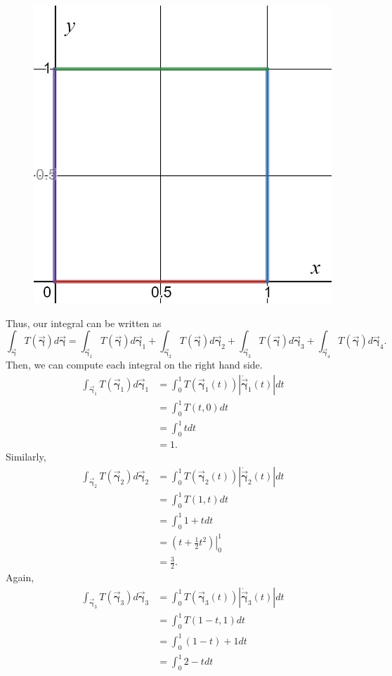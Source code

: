 \documentclass[12pt]{article} %
\newcommand{\curvegamma}{\boldsymbol{\vec{\gamma}}}
\newcommand{\tangentgamma}{\boldsymbol{\dot{\vec{\gamma}}}}
\begin{document}
\begin{solution}
\begin{enumerate}[(a)]
\begin{figure}[H]
			\includegraphics[width=.6\textwidth]{figures/plate_boundary.png}
		\end{figure}
		Thus, our integral can be written as
		\[
		\int_{\curvegamma} T(\curvegamma) d\curvegamma = \int_{\curvegamma_1} T(\curvegamma) d\curvegamma_1 + \int_{\curvegamma_2} T(\curvegamma) d\curvegamma_2 + \int_{\curvegamma_3} T(\curvegamma) d\curvegamma_3 + \int_{\curvegamma_4} T(\curvegamma) d\curvegamma_4.
		\]
		Then, we can compute each integral on the right hand side.
		\begin{align*}
			\int_{\curvegamma_1} T(\curvegamma_1) d\curvegamma_1 &= \int_0^1 T(\curvegamma_1(t))\left|\tangentgamma_1(t)\right|dt\\
			&= \int_0^1 T(t,0) dt\\
			&= \int_0^1 t dt\\
			&= 1.
		\end{align*}
		Similarly, 
		\begin{align*}
				\int_{\curvegamma_2} T(\curvegamma_2) d\curvegamma_2 &= \int_0^1 T(\curvegamma_2(t))\left|\tangentgamma_2(t)\right|dt\\
				&= \int_0^1 T(1,t) dt\\
				&= \int_0^1 1+t dt\\
				&= \left.\left(t+\frac{1}{2}t^2\right)\right\vert_0^1\\
				&= \frac{3}{2}.
		\end{align*}	
		Again,
		\begin{align*}
				\int_{\curvegamma_3} T(\curvegamma_3) d\curvegamma_3 &= \int_0^1 T(\curvegamma_3(t))\left|\tangentgamma_3(t)\right|dt\\
				&= \int_0^1 T(1-t,1) dt\\
				&= \int_0^1 (1-t)+1 dt\\
				&= \int_0^1 2-tdt\\

\end{align*}
\end{enumerate}
\end{solution}
\end{document}

